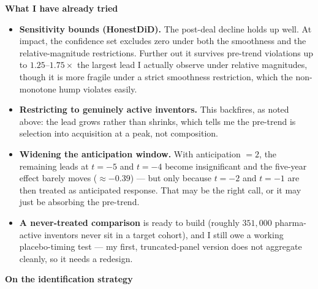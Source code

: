 \documentclass[10pt]{article}
\newcommand{\questionbanner}[1]{%
  \noindent\colorbox{softblue}{\parbox{\dimexpr\linewidth-2\fboxsep\relax}{\vspace{2pt}{\Large\bfseries\color{qblue}#1}\vspace{2pt}}}\par\vspace{5pt}}
\begin{document}
\vspace{5pt}
\textbf{What I have already tried}

\begin{itemize}
  \item \textbf{Sensitivity bounds (HonestDiD).} The post-deal decline holds up well. At impact, the confidence set excludes zero under both the smoothness and the relative-magnitude restrictions. Further out it survives pre-trend violations up to $1.25$--$1.75\times$ the largest lead I actually observe under relative magnitudes, though it is more fragile under a strict smoothness restriction, which the non-monotone hump violates easily.
  \item \textbf{Restricting to genuinely active inventors.} This backfires, as noted above: the lead grows rather than shrinks, which tells me the pre-trend is selection into acquisition at a peak, not composition.
  \item \textbf{Widening the anticipation window.} With anticipation $=2$, the remaining leads at $t=-5$ and $t=-4$ become insignificant and the five-year effect barely moves ($\approx -0.39$) --- but only because $t=-2$ and $t=-1$ are then treated as anticipated response. That may be the right call, or it may just be absorbing the pre-trend.
  \item \textbf{A never-treated comparison} is ready to build (roughly $351{,}000$ pharma-active inventors never sit in a target cohort), and I still owe a working placebo-timing test --- my first, truncated-panel version does not aggregate cleanly, so it needs a redesign.
\end{itemize}

\newpage

\questionbanner{Questions}

\textbf{On the identification strategy}
\end{document}
